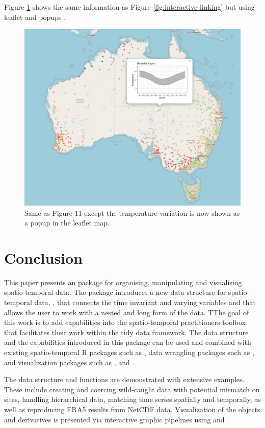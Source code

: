 \documentclass[
]{jss}
\begin{document}
Figure \ref{fig:interactive-popup} shows the same information as Figure \ref{fig:interactive-linking} but using leaflet and popups \citep{leafpop}.

\begin{CodeChunk}
\begin{figure}

{\centering \includegraphics[width=0.45\linewidth,height=0.25\textheight]{../figures/popup-mid} 

}

\caption[Same as Figure 11 except the temperature variation is now shown as a popup in the leaflet map]{Same as Figure 11 except the temperature variation is now shown as a popup in the leaflet map.}\label{fig:interactive-popup}
\end{figure}
\end{CodeChunk}

\hypertarget{conclude}{%
\section{Conclusion}\label{conclude}}

This paper presents an  package  for organising, manipulating and visualising spatio-temporal data. The package introduces a new data structure for spatio-temporal data, , that connects the time invariant and varying variables and that allows the user to work with a nested and long form of the data. TThe goal of this work is to add capabilities into the spatio-temporal practitioners toolbox that facilitates their work within the tidy data framework. The data structure and the capabilities introduced in this package can be used and combined with existing spatio-temporal R packages such as , data wrangling packages such as , and visualization packages such as ,  and .

The data structure and functions are demonstrated with extensive examples. These include creating and coercing wild-caught data with potential mismatch on sites, handling hierarchical data, matching time series spatially and temporally, as well as reproducing ERA5 results from NetCDF data. Visualization of the  objects and derivatives is presented via interactive graphic pipelines using  and .
\end{document}

